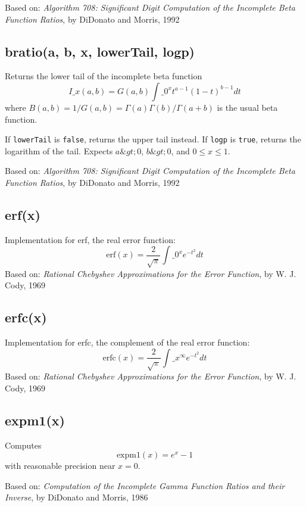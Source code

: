 \documentclass{article}
\begin{document}
Based on: \emph{Algorithm 708: Significant Digit Computation of the Incomplete Beta Function
Ratios}, by DiDonato and Morris, 1992


    \subsection*{bratio(a, b, x, lowerTail, logp)}
    Returns the lower tail of the incomplete beta function
$$I\_x(a, b)=G(a,b)\int\_0^xt^{a-1}(1-t)^{b-1}dt$$
where $B(a,b)=1/G(a,b) = \Gamma(a)\Gamma(b)/\Gamma(a+b)$ is the
usual beta function.


If \texttt{lowerTail} is \texttt{false}, returns the upper tail instead.
If \texttt{logp} is \texttt{true}, returns the logarithm of the tail.
Expects $a\&gt;0$, $b\&gt;0$, and $0 \leq x \leq 1$.


Based on: \emph{Algorithm 708: Significant Digit Computation of the Incomplete Beta Function
Ratios}, by DiDonato and Morris, 1992


    \subsection*{erf(x)}
    Implementation for erf, the real error function:
$$\textrm{erf}(x) = \frac{2}{\sqrt{\pi}}\int\_0^x e^{-t^2} dt$$
Based on: \emph{Rational Chebyshev Approximations for the Error
Function}, by W. J. Cody, 1969


    \subsection*{erfc(x)}
    Implementation for erfc, the complement of the real error function:
$$\textrm{erfc}(x) = \frac{2}{\sqrt{\pi}}\int\_x^\infty e^{-t^2} dt$$
Based on: \emph{Rational Chebyshev Approximations for the Error
Function}, by W. J. Cody, 1969


    \subsection*{expm1(x)}
    Computes $$\textrm{expm1}(x) = e^x - 1$$ with reasonable precision near $x = 0$.


Based on:  \emph{Computation of the Incomplete Gamma Function Ratios
and their Inverse}, by DiDonato and Morris, 1986
\end{document}
